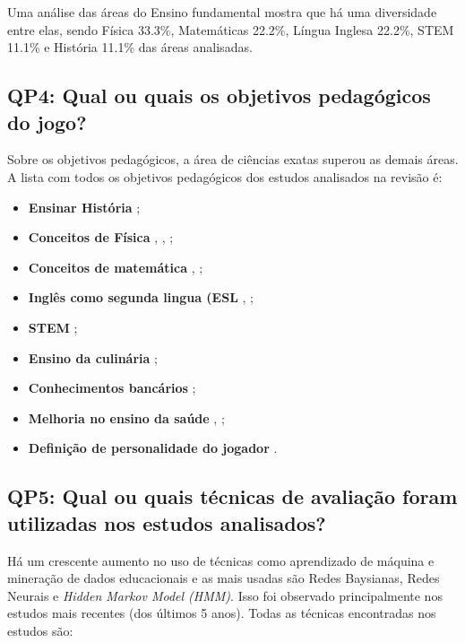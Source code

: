 \documentclass[12pt]{article}
\begin{document}
Uma análise das áreas do Ensino fundamental mostra que há uma diversidade entre elas, sendo Física 33.3\%, Matemáticas 22.2\%, Língua Inglesa 22.2\%, STEM 11.1\% e História 11.1\% das áreas analisadas.

\subsection{QP4: Qual ou quais os objetivos pedagógicos do jogo?}

Sobre os objetivos pedagógicos, a área de ciências exatas superou as demais áreas. A lista com todos os objetivos pedagógicos dos estudos analisados na revisão é:

\begin{itemize}
    \item \textbf{Ensinar História} \cite{del2010easing};
    \item \textbf{Conceitos de Física} \cite{rowe2017assessing}, \cite{asbell2013assessment}, \cite{harpstead2013search};
    \item \textbf{Conceitos de matemática} \cite{mota2017environment}, \cite{falakmasir2016data};
    \item \textbf{Inglês como segunda lingua (ESL} \cite{kam2007localized}, \cite{kam2009improving};
    \item \textbf{STEM} \cite{conrad2014framework};
    \item \textbf{Ensino da culinária} \cite{moreno2007game};
    \item \textbf{Conhecimentos bancários} \cite{thomas2012evaluate};
    \item \textbf{Melhoria no ensino da saúde} \cite{de20163d}, \cite{georgiadis2019bolstering};
    \item \textbf{Definição de personalidade do jogador} \cite{georgiadis2019reinforcing}.
\end{itemize}

\subsection{QP5: Qual ou quais técnicas de avaliação foram utilizadas nos estudos analisados?}

Há um crescente aumento no uso de técnicas como aprendizado de máquina e mineração de dados educacionais e as mais usadas são Redes Baysianas, Redes Neurais e \textit{Hidden Markov Model (HMM)}. Isso foi observado principalmente nos estudos mais recentes (dos últimos 5 anos). Todas as técnicas encontradas nos estudos são:
\end{document}
